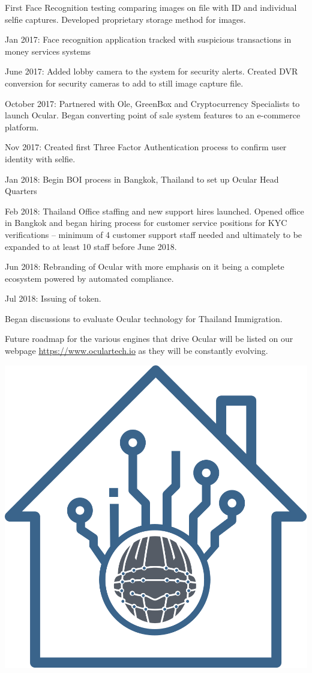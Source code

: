 \documentclass[a4paper]{article}
\let\tempone\itemize
\let\temptwo\enditemize
\renewenvironment{itemize}{\tempone\addtolength{\itemsep}{-5pt}}{\temptwo}
\begin{document}
\begin{itemize}
\item First Face Recognition testing comparing images on file with ID and individual selfie captures. Developed proprietary storage method for images.
\item Jan 2017: Face recognition application tracked with suspicious transactions in money services systems
\item June 2017: Added lobby camera to the system for security alerts. Created DVR conversion for security cameras to add to still image capture file.
\item October 2017: Partnered with Ole, GreenBox and Cryptocurrency Specialists to launch Ocular. Began converting point of sale system features to an e-commerce platform.
\item Nov 2017: Created first Three Factor Authentication process to confirm user identity with selfie.
\item Jan 2018: Begin BOI process in Bangkok, Thailand to set up Ocular Head Quarters
\item Feb 2018: Thailand Office staffing and new support hires launched. Opened office in Bangkok and began hiring process for customer service positions for KYC verifications – minimum of 4 customer support staff needed and ultimately to be expanded to at least 10 staff before June 2018.
\item Jun 2018: Rebranding of Ocular with more emphasis on it being a complete ecosystem powered by automated compliance. 
\item Jul 2018: Issuing of token. 
\item Began discussions to evaluate Ocular technology for Thailand Immigration.

 \end{itemize}
Future roadmap for the various engines that drive Ocular will be listed on our webpage \url{https://www.oculartech.io} as they will be constantly evolving.
\newpage
\centerline{\includegraphics[width=1.0\textwidth]{ocular-realestate}}
\end{document}
